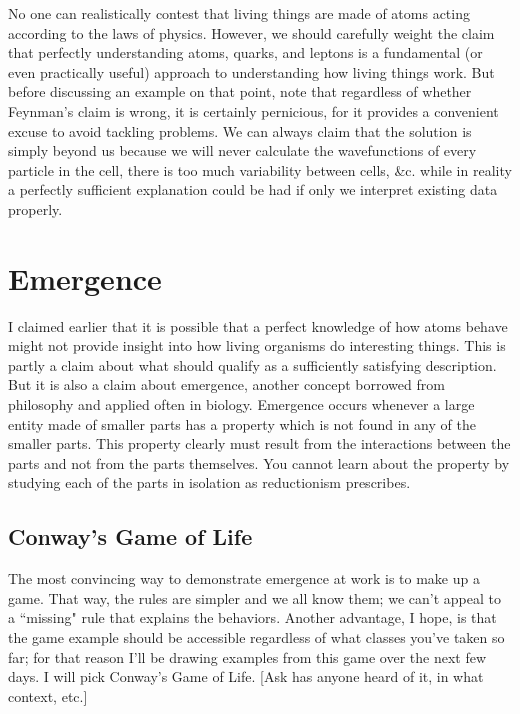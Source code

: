\documentclass{article}
\begin{document}
No one can realistically contest that living things are made of atoms acting according to the laws of physics. However, we should carefully weight the claim that perfectly understanding atoms, quarks, and leptons is a fundamental (or even practically useful) approach to understanding how living things work. But before discussing an example on that point, note that regardless of whether Feynman's claim is wrong, it is certainly pernicious, for it provides a convenient excuse to avoid tackling problems. We can always claim that the solution is simply beyond us because we will never calculate the wavefunctions of every particle in the cell, there is too much variability between cells, \&c. while in reality a perfectly sufficient explanation could be had if only we interpret existing data properly.

\section*{Emergence}

I claimed earlier that it is possible that a perfect knowledge of how atoms behave might not provide insight into how living organisms do interesting things. This is partly a claim about what should qualify as a sufficiently satisfying description. But it is also a claim about emergence, another concept borrowed from philosophy and applied often in biology. Emergence occurs whenever a large entity made of smaller parts has a property which is not found in any of the smaller parts. This property clearly must result from the interactions between the parts and not from the parts themselves. You cannot learn about the property by studying each of the parts in isolation as reductionism prescribes.

\subsection*{Conway's Game of Life}

The most convincing way to demonstrate emergence at work is to make up a game. That way, the rules are simpler and we all know them; we can't appeal to a ``missing" rule that explains the behaviors. Another advantage, I hope, is that the game example should be accessible regardless of what classes you've taken so far; for that reason I'll be drawing examples from this game over the next few days. I will pick Conway's Game of Life. [Ask has anyone heard of it, in what context, etc.]\\
\end{document}

